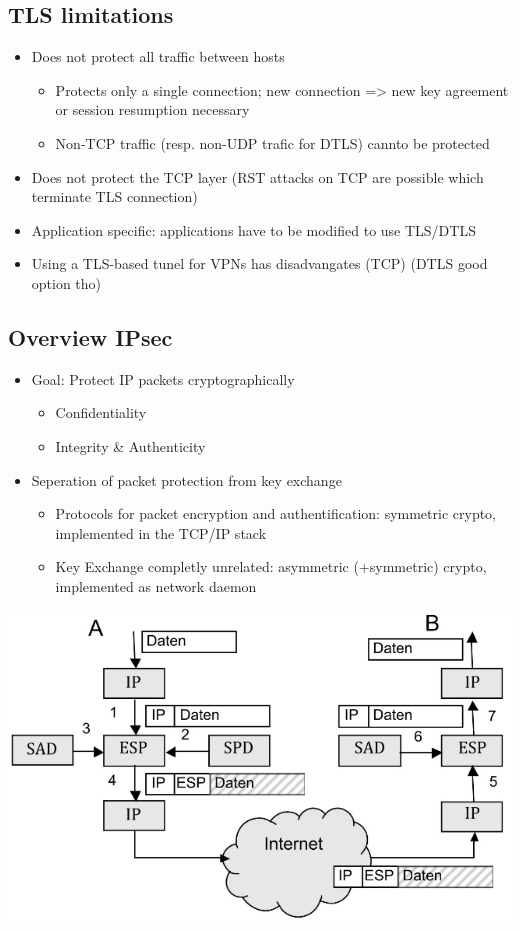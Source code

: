 \subsection{TLS limitations}
\begin{itemize}
  \item Does not protect all traffic between hosts
    \begin{itemize}
      \item Protects only a single connection; new connection => new key agreement or session resumption necessary
      \item Non-TCP traffic (resp. non-UDP trafic for DTLS) cannto be protected
    \end{itemize}
  \item Does not protect the TCP layer (RST attacks on TCP are possible which terminate TLS connection)
  \item Application specific: applications have to be modified to use TLS/DTLS
  \item Using a TLS-based tunel for VPNs has disadvangates (TCP) (DTLS good option tho)
\end{itemize}

\subsection{Overview IPsec}
\begin{itemize}
  \item Goal: Protect IP packets cryptographically
    \begin{itemize}
      \item Confidentiality
      \item Integrity \& Authenticity
    \end{itemize}
  \item Seperation of packet protection from key exchange
    \begin{itemize}
      \item Protocols for packet encryption and authentification:
        symmetric crypto, implemented in the TCP/IP stack
      \item Key Exchange completly unrelated:
        asymmetric (+symmetric) crypto, implemented as network daemon
    \end{itemize}
\end{itemize}
\includegraphics[width=\columnwidth]{Resources/ipsec_overview.png}

